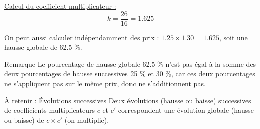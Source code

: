 \documentclass[xcolor={dvipsnames}]{beamer}
\begin{document}
\begin{frame}{}
\begin{enumerate}[1)]
\begin{table}[h!]
		\end{table}
		
		
	\end{enumerate}

\end{frame}


\begin{frame}{}

		\underline{Calcul du coefficient multiplicateur :}
		\begin{equation*}
		k = \dfrac{26}{16} = \num{1.625}
		\end{equation*}\pause
				
		On peut aussi calculer indépendamment des prix : $\num{1.25} \times \num{1.30} = \num{1.625}$, soit une hausse globale de \num{62.5} \%. \pause
		
		\begin{block}{Remarque}
			Le pourcentage de hausse globale \num{62.5} \% n'est pas égal à la somme des deux pourcentages de hausse successives \num{25} \% et \num{30} \%, car ces deux pourcentages ne s'appliquent pas sur le même prix, donc ne s'additionnent pas.
		\end{block}\pause
		
		\begin{alertblock}{\`A retenir : \'Evolutions successives}
			Deux évolutions (hausse ou baisse) successives de coefficients multiplicateurs $c$ et $c'$  correspondent  une évolution globale (hausse ou baisse) de $c \times c'$ (on multiplie).
		\end{alertblock}
	


\end{frame}
\end{document}

